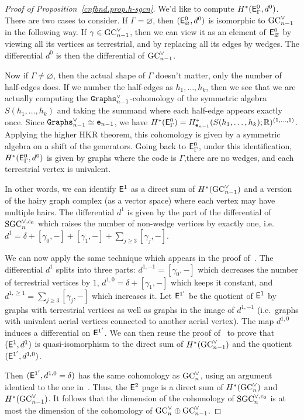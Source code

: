 \begin{proof}[Proof of Proposition~\ref{cnfbnd.prop.h-sgcn}]
  We'd like to compute $H^{*}(\EE^{0}_{\Gamma}, d^{0})$.
  There are two cases to consider.
  If $\Gamma = \varnothing$, then $(\EE^{0}_{\varnothing}, d^{0})$ is isomorphic to $\GC_{n-1}^{\vee}$ in the following way.
  If $\gamma \in \GC_{n-1}^{\vee}$, then we can view it as an element of $\EE^{0}_{\varnothing}$ by viewing all its vertices as terrestrial, and by replacing all its edges by wedges.
  The differential $d^{0}$ is then the differential of $\GC_{n-1}^{\vee}$.
  
  Now if $\Gamma \neq \varnothing$, then the actual shape of $\Gamma$ doesn't matter, only the number of half-edges does.
  If we number the half-edges as $h_{1}, \dots, h_{k}$, then we see that we are actually computing the $\Graphs_{n-1}^{\vee}$-cohomology of the symmetric algebra $S(h_{1}, \dots, h_{k})$ and taking the summand where each half-edge appears exactly once.
  Since $\Graphs_{n-1}^{\vee} \simeq \en[n-1]$, we have $H^{*}(\EE^{0}_{\Gamma}) = H^{*}_{\en[n-1]}(S(h_{1}, \dots, h_{k}); \R)^{(1, \dots, 1)}$.
  Applying the higher HKR theorem, this cohomology is given by a symmetric algebra on a shift of the generators.
  Going back to $\EE^{0}_{\Gamma}$, under this identification, $H^{*}(\EE^{0}_{\Gamma}, d^{0})$ is given by graphs where the code is $\Gamma$,there are no wedges, and each terrestrial vertex is univalent.

  In other words, we can identify $\EE^{1}$ as a direct sum of $H^{*}(\GC_{n-1}^{\vee})$ and a version of the hairy graph complex (as a vector space) where each vertex may have multiple hairs.
  The differential $d^{1}$ is given by the part of the differential of $\SGC_{n}^{\vee,c_{0}}$ which raises the number of non-wedge vertices by exactly one, i.e. $d^{1} = \delta + [\gamma_{0}, -] + [ \gamma_{1}, -] + \sum_{j \geq 3} [\gamma_{j}, -]$.

  We can now apply the same technique which appears in the proof of~\cite[Claim~2]{Willwacher2016}.
  The differential $d^{1}$ splits into three parts: $d^{1,-1} = [\gamma_{0},-]$ which decreases the number of terrestrial vertices by $1$, $d^{1,0} = \delta + [\gamma_{1}, -]$ which keeps it constant, and $d^{1,\geq 1} = \sum_{j \geq 3} [\gamma_{j}, -]$ which increases it.
  Let $\EE^{1'}$ be the quotient of $\EE^{1}$ by graphs with  terrestrial vertices as well as graphs in the image of $d^{1,-1}$ (i.e.\ graphs with univalent aerial vertices connected to another aerial vertex).
  The map $d^{1,0}$ induces a differential on $\EE^{1'}$.
  We can then reuse the proof of~\cite[Claim~2]{Willwacher2016} to prove that $(\EE^{1}, d^{1})$ is quasi-isomorphism to the direct sum of $H^{*}(\GC_{n-1}^{\vee})$ and the quotient $(\EE^{1'}, d^{1,0})$.

  Then $(\EE^{1'}, d^{1,0} = \delta)$ has the same cohomology as $\GC_{n}^{\vee}$, using an argument identical to the one in~\cite[Appendix~F.2.1]{Willwacher2016}.
  Thus, the $\EE^{2}$ page is a direct sum of $H^{*}(\GC_{n}^{\vee})$ and $H^{*}(\GC_{n-1}^{\vee})$.
  It follows that the dimension of the cohomology of $\SGC_{n}^{\vee,c_{0}}$ is at most the dimension of the cohomology of $\GC_{n}^{\vee} \oplus \GC_{n-1}^{\vee}$.
\end{proof}

